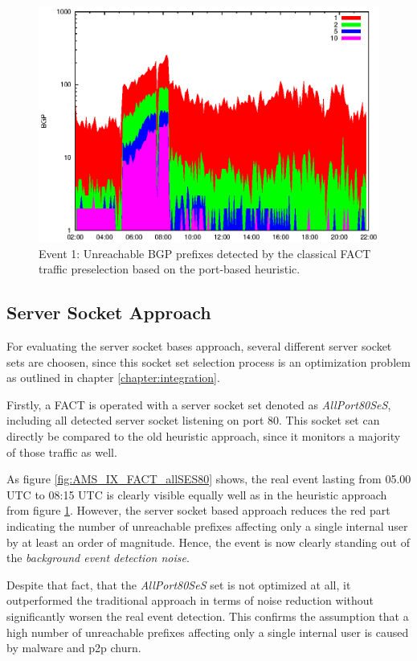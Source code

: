 \begin{figure}
	[p] \centering 
	\includegraphics[width=0.75\linewidth]{images/events/2010_03_25/bgp_log_port80_ref.eps}
	\caption{Event 1: Unreachable BGP prefixes detected by the classical FACT traffic preselection based on the port-based heuristic.} 
	\label{fig:AMS_IX_FACT_REF} 
\end{figure}

\subsection{Server Socket Approach}
For evaluating the server socket bases approach, several different server socket sets are choosen, since this socket set selection process is an optimization problem as outlined in chapter \ref{chapter:integration}.

Firstly, a FACT is operated with a server socket set denoted as \emph{AllPort80SeS}, including all detected server socket listening on port 80. This socket set can directly be compared to the old heuristic approach, since it monitors a majority of those traffic as well. 

As figure \ref{fig:AMS_IX_FACT_allSES80} shows, the real event lasting from 05.00 UTC to 08:15 UTC is clearly visible equally well as in the heuristic approach from figure \ref{fig:AMS_IX_FACT_REF}. However, the server socket based approach reduces the red part indicating the number of unreachable prefixes affecting only a single internal user by at least an order of magnitude. Hence,  the event is now clearly standing out of the \emph{background event detection noise}.

Despite that fact, that the \emph{AllPort80SeS} set is not optimized at all, it outperformed the traditional approach in terms of noise reduction without significantly worsen the real event detection. This confirms the assumption that a high number of unreachable prefixes affecting only a single internal user is caused by malware and p2p churn.


